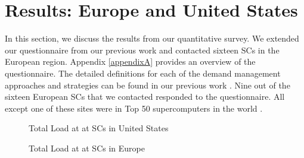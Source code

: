 \section{Results: Europe and United States}
\label{res}
In this section, we discuss the results from our quantitative survey. We extended our questionnaire from our previous work \cite{BatesESP} and contacted sixteen SCs in the European region.  Appendix \ref{appendixA} provides an overview of the questionnaire. The detailed definitions for each of the demand management approaches and strategies can be found in our previous work \cite{BatesESP}. Nine out of the sixteen European SCs that we contacted responded to the questionnaire. All except one of these sites were in Top 50 supercomputers in the world \cite{Top500}. 


\begin{figure}[ht!]
\begin{center}
\caption{Total Load at at SCs in United States}
\label{fig:USload}
\vspace{0.9cm}
\caption{Total Load at at SCs in Europe}
\label{fig:EUload}
\end{center}
\end{figure}

